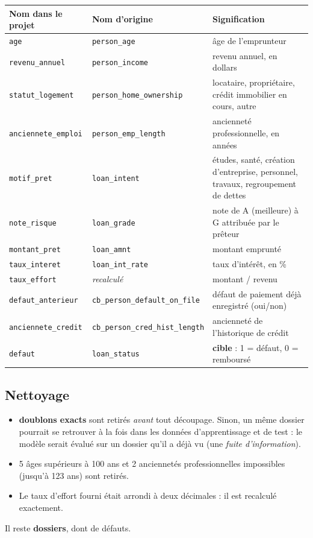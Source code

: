 \documentclass[11pt,a4paper]{article}
\newcommand{\code}[1]{\texttt{#1}}
\begin{document}
\begin{center}\small
\begin{tabularx}{\linewidth}{@{}l l X@{}}
\toprule
\textbf{Nom dans le projet} & \textbf{Nom d'origine} & \textbf{Signification} \\
\midrule
\code{age} & \code{person\_age} & âge de l'emprunteur \\
\code{revenu\_annuel} & \code{person\_income} & revenu annuel, en dollars \\
\code{statut\_logement} & \code{person\_home\_ownership} & locataire, propriétaire, crédit immobilier en cours, autre \\
\code{anciennete\_emploi} & \code{person\_emp\_length} & ancienneté professionnelle, en années \\
\code{motif\_pret} & \code{loan\_intent} & études, santé, création d'entreprise, personnel, travaux, regroupement de dettes \\
\code{note\_risque} & \code{loan\_grade} & note de A (meilleure) à G attribuée par le prêteur \\
\code{montant\_pret} & \code{loan\_amnt} & montant emprunté \\
\code{taux\_interet} & \code{loan\_int\_rate} & taux d'intérêt, en \% \\
\code{taux\_effort} & \emph{recalculé} & montant / revenu \\
\code{defaut\_anterieur} & \code{cb\_person\_default\_on\_file} & défaut de paiement déjà enregistré (oui/non) \\
\code{anciennete\_credit} & \code{cb\_person\_cred\_hist\_length} & ancienneté de l'historique de crédit \\
\code{defaut} & \code{loan\_status} & \textbf{cible} : 1 = défaut, 0 = remboursé \\
\bottomrule
\end{tabularx}
\end{center}

\subsection{Nettoyage}
\begin{itemize}
\item \textbf{\nDoublons{} doublons exacts} sont retirés \emph{avant} tout découpage. Sinon, un même dossier pourrait se retrouver à la fois dans les données d'apprentissage et de test : le modèle serait évalué sur un dossier qu'il a déjà vu (une \emph{fuite d'information}).
\item 5 âges supérieurs à 100 ans et 2 anciennetés professionnelles impossibles (jusqu'à 123 ans) sont retirés.
\item Le taux d'effort fourni était arrondi à deux décimales : il est recalculé exactement.
\end{itemize}
Il reste \textbf{\nFinal{} dossiers}, dont \tauxDefaut{} de défauts.
\end{document}
